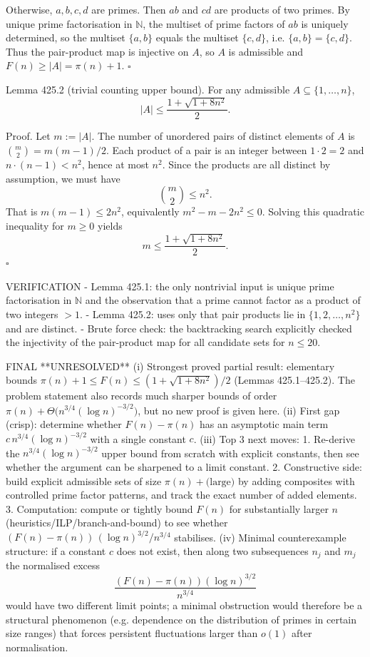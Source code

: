 Otherwise, $a,b,c,d$ are primes. Then $ab$ and $cd$ are products of two primes. By unique prime factorisation in $\mathbb N$, the multiset of prime factors of $ab$ is uniquely determined, so the multiset $\{a,b\}$ equals the multiset $\{c,d\}$, i.e. $\{a,b\}=\{c,d\}$.
Thus the pair-product map is injective on $A$, so $A$ is admissible and $F(n)\ge |A|=\pi(n)+1$.
\hfill $\square$

Lemma 425.2 (trivial counting upper bound).
For any admissible $A\subseteq\{1,\dots,n\}$,
\[
|A|\le \frac{1+\sqrt{1+8n^2}}{2}.
\]

Proof.
Let $m:=|A|$. The number of unordered pairs of distinct elements of $A$ is $\binom{m}{2}=m(m-1)/2$.
Each product of a pair is an integer between $1\cdot 2=2$ and $n\cdot (n-1)<n^2$, hence at most $n^2$.
Since the products are all distinct by assumption, we must have
\[
\binom{m}{2}\le n^2.
\]
That is $m(m-1)\le 2n^2$, equivalently $m^2-m-2n^2\le 0$.
Solving this quadratic inequality for $m\ge 0$ yields
\[
 m\le \frac{1+\sqrt{1+8n^2}}{2}.
\]
\hfill $\square$

VERIFICATION
- Lemma 425.1: the only nontrivial input is unique prime factorisation in $\mathbb N$ and the observation that a prime cannot factor as a product of two integers $>1$.
- Lemma 425.2: uses only that pair products lie in $\{1,2,\dots,n^2\}$ and are distinct.
- Brute force check: the backtracking search explicitly checked the injectivity of the pair-product map for all candidate sets for $n\le 20$.

FINAL
**UNRESOLVED**
(i) Strongest proved partial result: elementary bounds $\pi(n)+1\le F(n)\le (1+\sqrt{1+8n^2})/2$ (Lemmas 425.1–425.2). The problem statement also records much sharper bounds of order $\pi(n)+\Theta\bigl(n^{3/4}(\log n)^{-3/2}\bigr)$, but no new proof is given here.
(ii) First gap (crisp): determine whether $F(n)-\pi(n)$ has an asymptotic main term $c\,n^{3/4}(\log n)^{-3/2}$ with a single constant $c$.
(iii) Top 3 next moves:
  1. Re-derive the $n^{3/4}(\log n)^{-3/2}$ upper bound from scratch with explicit constants, then see whether the argument can be sharpened to a limit constant.
  2. Constructive side: build explicit admissible sets of size $\pi(n)+\text{(large)}$ by adding composites with controlled prime factor patterns, and track the exact number of added elements.
  3. Computation: compute or tightly bound $F(n)$ for substantially larger $n$ (heuristics/ILP/branch-and-bound) to see whether $(F(n)-\pi(n))\,(\log n)^{3/2}/n^{3/4}$ stabilises.
(iv) Minimal counterexample structure: if a constant $c$ does not exist, then along two subsequences $n_j$ and $m_j$ the normalised excess
\[
\frac{(F(n)-\pi(n))(\log n)^{3/2}}{n^{3/4}}
\]
would have two different limit points; a minimal obstruction would therefore be a structural phenomenon (e.g. dependence on the distribution of primes in certain size ranges) that forces persistent fluctuations larger than $o(1)$ after normalisation.



